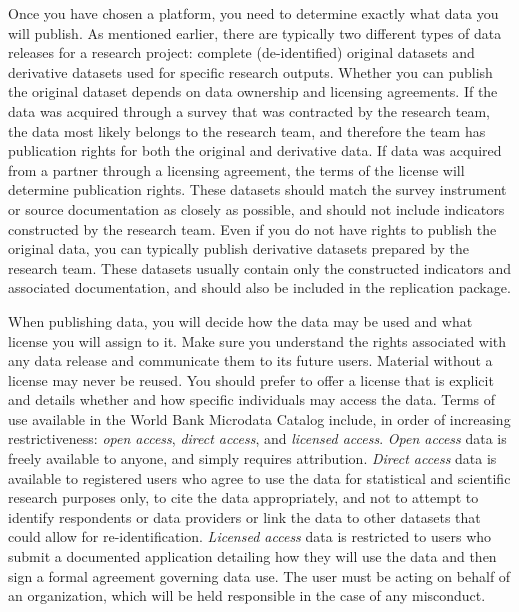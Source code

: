 Once you have chosen a platform, you need to determine exactly what data you will publish.
As mentioned earlier, there are typically two different types of data releases for a research project:
complete (de-identified) original datasets and derivative datasets used for specific research outputs.
Whether you can publish the original dataset depends on data ownership and licensing agreements.
If the data was acquired through a survey that was contracted by the research team,
the data most likely belongs to the research team,
and therefore the team has publication rights for both the original and derivative data.
If data was acquired from a partner through a licensing agreement,
the terms of the license will determine publication rights.
These datasets should match the survey instrument or source documentation as closely as possible,
and should not include indicators constructed by the research team.
Even if you do not have rights to publish the original data,
you can typically publish derivative datasets prepared by the research team.
These datasets usually contain only the constructed indicators and associated documentation,\cite{dupriez2007}
and should also be included in the replication package.

When publishing data,
you will decide how the data may be used and what license you will assign to it.
Make sure you understand the rights associated with any data release
and communicate them to its future users.
Material without a license may never be reused.
You should prefer to offer a license that is explicit
and details whether and how specific individuals may access the data.
Terms of use available in the World Bank Microdata Catalog include,
in order of increasing restrictiveness:
\textit{open access}, \textit{direct access}, and \textit{licensed access}.
\textit{Open access} data is freely available to anyone, and simply requires attribution.
\textit{Direct access} data is available to registered users who agree
to use the data for statistical and scientific research purposes only,
to cite the data appropriately,
and not to attempt to identify respondents or data providers
or link the data to other datasets that could allow for re-identification.
\textit{Licensed access} data is restricted to users
who submit a documented application detailing
how they will use the data and then sign a formal agreement governing data use.
The user must be acting on behalf of an organization,
which will be held responsible in the case of any misconduct.

